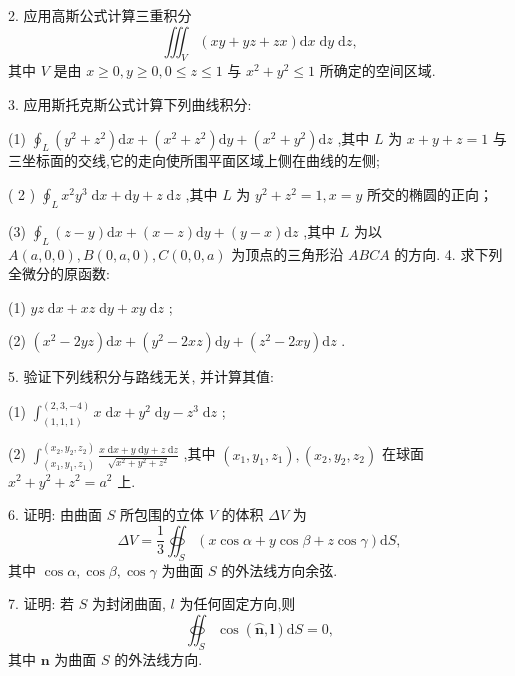 2. 应用高斯公式计算三重积分
\[
{\iiint }_{V}\left( {{xy} + {yz} + {zx}}\right) \mathrm{d}x\mathrm{\;d}y\mathrm{\;d}z,
\]
其中 \(V\) 是由 \(x \geq  0,y \geq  0,0 \leq  z \leq  1\) 与 \({x}^{2} + {y}^{2} \leq  1\) 所确定的空间区域.

3. 应用斯托克斯公式计算下列曲线积分:

(1) \({\oint }_{L}\left( {{y}^{2} + {z}^{2}}\right) \mathrm{d}x + \left( {{x}^{2} + {z}^{2}}\right) \mathrm{d}y + \left( {{x}^{2} + {y}^{2}}\right) \mathrm{d}z\) ,其中 \(L\) 为 \(x + y + z = 1\) 与三坐标面的交线,它的走向使所围平面区域上侧在曲线的左侧;

( 2 ) \({\oint }_{L}{x}^{2}{y}^{3}\mathrm{\;d}x + \mathrm{d}y + z\mathrm{\;d}z\) ,其中 \(L\) 为 \({y}^{2} + {z}^{2} = 1,x = y\) 所交的椭圆的正向；

(3) \({\oint }_{L}\left( {z - y}\right) \mathrm{d}x + \left( {x - z}\right) \mathrm{d}y + \left( {y - x}\right) \mathrm{d}z\) ,其中 \(L\) 为以 \(A\left( {a,0,0}\right) ,B\left( {0,a,0}\right) ,C\left( {0,0,a}\right)\) 为顶点的三角形沿 \({ABCA}\) 的方向. 4. 求下列全微分的原函数:

(1) \({yz}\mathrm{\;d}x + {xz}\mathrm{\;d}y + {xy}\mathrm{\;d}z\) ;

(2) \(\left( {{x}^{2} - {2yz}}\right) \mathrm{d}x + \left( {{y}^{2} - {2xz}}\right) \mathrm{d}y + \left( {{z}^{2} - {2xy}}\right) \mathrm{d}z\) .

5. 验证下列线积分与路线无关, 并计算其值:

(1) \({\int }_{\left( 1,1,1\right) }^{\left( 2,3, - 4\right) }x\mathrm{\;d}x + {y}^{2}\mathrm{\;d}y - {z}^{3}\mathrm{\;d}z\) ;

(2) \({\int }_{\left( {x}_{1},{y}_{1},{z}_{1}\right) }^{\left( {x}_{2},{y}_{2},{z}_{2}\right) }\frac{x\mathrm{\;d}x + y\mathrm{\;d}y + z\mathrm{\;d}z}{\sqrt{{x}^{2} + {y}^{2} + {z}^{2}}}\) ,其中 \(\left( {{x}_{1},{y}_{1},{z}_{1}}\right) ,\left( {{x}_{2},{y}_{2},{z}_{2}}\right)\) 在球面 \({x}^{2} + {y}^{2} + {z}^{2} = {a}^{2}\) 上.

6. 证明: 由曲面 \(S\) 所包围的立体 \(V\) 的体积 \({\Delta V}\) 为
\[
{\Delta V} = \frac{1}{3}{\oiint }_{S}\left( {x\cos \alpha  + y\cos \beta  + z\cos \gamma }\right) \mathrm{d}S,
\]
其中 \(\cos \alpha ,\cos \beta ,\cos \gamma\) 为曲面 \(S\) 的外法线方向余弦.

7. 证明: 若 \(S\) 为封闭曲面, \(l\) 为任何固定方向,则
\[
{\oiint }_{S}\cos \left( {\overset{⏜}{\mathbf{n}},\mathbf{l}}\right) \mathrm{d}S = 0,
\]
其中 \(\mathbf{n}\) 为曲面 \(S\) 的外法线方向.

